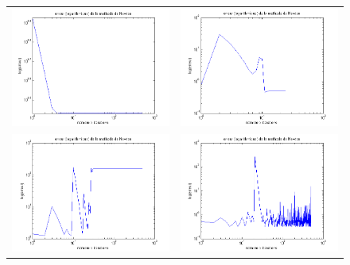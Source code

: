 \begin{figure}
\centering
\begin{tabular}{cc}
\includegraphics[width = 10cm]{erreur5.png} & \includegraphics[width = 10cm]{erreur2.png}\\
\includegraphics[width = 10cm]{erreur.png} & \includegraphics[width = 10cm]{erreur4.png}\\

\end{tabular}
\end{figure}
